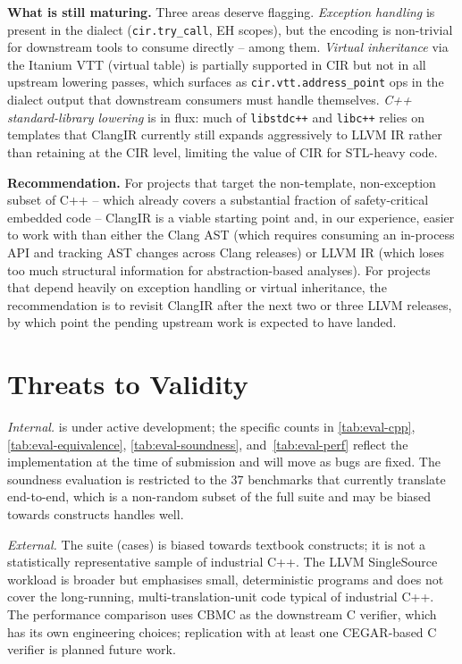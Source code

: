 \textbf{What is still maturing.} %
Three areas deserve flagging. %
\emph{Exception handling} is present in the dialect (\texttt{cir.try\_call}, EH scopes), but the encoding is non-trivial for downstream tools to consume directly -- \toolcirc among them. %
\emph{Virtual inheritance} via the Itanium VTT (virtual table) is partially supported in CIR but not in all upstream lowering passes, which surfaces as \texttt{cir.vtt.address\_point} ops in the dialect output that downstream consumers must handle themselves. %
\emph{C++ standard-library lowering} is in flux: much of \texttt{libstdc++} and \texttt{libc++} relies on templates that ClangIR currently still expands aggressively to LLVM IR rather than retaining at the CIR level, limiting the value of CIR for STL-heavy code. %

\textbf{Recommendation.} %
For projects that target the non-template, non-exception subset of C++ -- which already covers a substantial fraction of safety-critical embedded code -- ClangIR is a viable starting point and, in our experience, easier to work with than either the Clang AST (which requires consuming an in-process API and tracking AST changes across Clang releases) or LLVM IR (which loses too much structural information for abstraction-based analyses). %
For projects that depend heavily on exception handling or virtual inheritance, the recommendation is to revisit ClangIR after the next two or three LLVM releases, by which point the pending upstream work is expected to have landed. %

\section{Threats to Validity}\label{sec:threats}


\textit{Internal.} \toolcirc is under active development; the specific counts in \autoref{tab:eval-cpp}, \autoref{tab:eval-equivalence}, \autoref{tab:eval-soundness}, and~\autoref{tab:eval-perf} reflect the implementation at the time of submission and will move as bugs are fixed. %
The soundness evaluation is restricted to the 37 benchmarks that currently translate end-to-end, which is a non-random subset of the full suite and may be biased towards constructs \toolcirc handles well. %

\textit{External.} The suite (\esbmcTotal cases) is biased towards textbook constructs; it is not a statistically representative sample of industrial C++. %
The LLVM SingleSource workload is broader but emphasises small, deterministic programs and does not cover the long-running, multi-translation-unit code typical of industrial C++. %
The performance comparison uses CBMC as the downstream C verifier, which has its own engineering choices; replication with at least one CEGAR-based C verifier is planned future work. %

